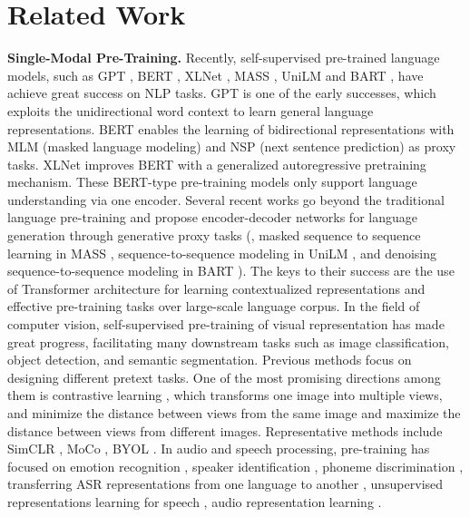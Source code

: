 \documentclass[10pt,twocolumn,letterpaper]{article}
\begin{document}
\section{Related Work}
\textbf{Single-Modal Pre-Training.} Recently, self-supervised pre-trained language models, such as GPT \cite{gpt}, BERT \cite{bert}, XLNet \cite{xlnet}, MASS \cite{mass}, UniLM \cite{dong19unified} and BART \cite{bart}, have achieve great success on NLP tasks. GPT \cite{gpt} is one of the early successes, which exploits the unidirectional word context to learn general language representations. BERT \cite{bert} enables the learning of bidirectional representations with MLM (masked language modeling) and NSP (next sentence prediction) as proxy tasks. XLNet \cite{xlnet} improves BERT with a generalized autoregressive pretraining mechanism. These BERT-type pre-training models only support language understanding via one encoder. Several recent works go beyond the traditional language pre-training and propose encoder-decoder networks for language generation through generative proxy tasks (\eg, masked sequence to sequence learning in MASS \cite{mass}, sequence-to-sequence modeling in UniLM \cite{dong19unified}, and denoising sequence-to-sequence modeling in BART \cite{bart}). The keys to their success are the use of Transformer \cite{vaswani2017attention} architecture for learning contextualized representations and effective pre-training tasks over large-scale language corpus. In the field of computer vision, self-supervised pre-training of visual representation has made great progress, facilitating many downstream tasks such as image classification, object detection, and semantic segmentation. Previous methods focus on designing different pretext tasks. One of the most promising directions among them is contrastive learning \cite{oord2018representation}, which transforms one image into multiple views, and minimize the distance between views from the same image and maximize the distance between views from different images. Representative methods include SimCLR \cite{chen2020simple}, MoCo \cite{he2020momentum}, BYOL \cite{grill2020bootstrap}.
In audio and speech processing, pre-training has focused on emotion recognition \cite{lian2018improving}, speaker identification \cite{ravanelli2018learning}, phoneme discrimination \cite{synnaeve2016temporal,oord2018representation}, transferring ASR representations from one language to another \cite{kunze2017transfer},  unsupervised representations learning for speech \cite{schneider2019wav2vec}, audio representation learning \cite{wang2021multi}. 
\end{document}
